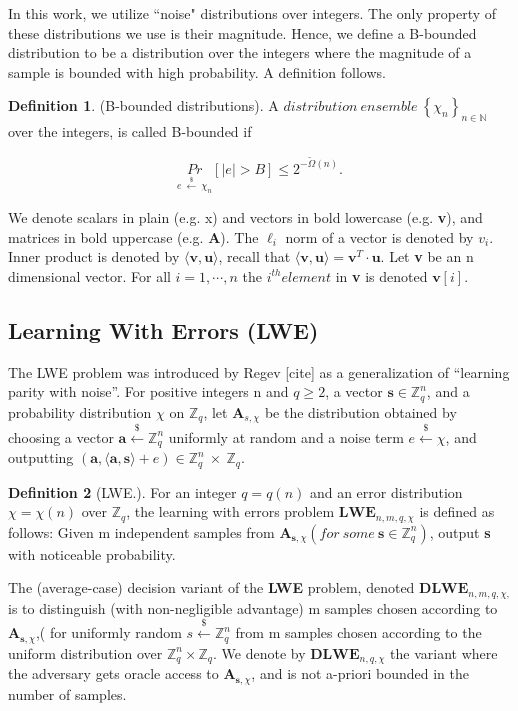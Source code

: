 \documentclass[10pt,journal,compsoc]{IEEEtran}
\theoremstyle{definition}
\newtheorem{definition}{Definition}[section]
\begin{document}
In this work, we utilize ``noise" distributions over integers. The only property of these distributions
we use is their magnitude. Hence, we define a B-bounded distribution to be a distribution
over the integers where the magnitude of a sample is bounded with high probability. A definition
follows.


\begin{definition}

(B-bounded distributions). A $distribution\ ensemble \ \left\{ \chi_n \right\}_{n \in \mathbb{N}}$ over the integers, is called B-bounded if 

$$\underset{e \ \xleftarrow{\$} \ \chi_n}{Pr} \left[ \left| e\right|> B\right] \leq 2^{-\widetilde{\Omega}\left(n\right)}.$$

We denote scalars in plain (e.g. x) and vectors in bold lowercase (e.g. \textbf{v}), and matrices in bold uppercase (e.g. \textbf{A}).  The $\ell_i$ norm of a vector is denoted by $v_i$. Inner product is denoted by $\langle \textbf{v},\textbf{u} \rangle$, recall that $\langle \textbf{v},\textbf{u} \rangle = \textbf{v}^T \cdot \textbf{u}$. Let \textbf{v} be an n dimensional vector. For all $i = 1,\cdots,n$ the $i^{th} element$ in \textbf{v} is denoted $\textbf{v}[i]$.

\end{definition}

\subsection{Learning With Errors (LWE)}

The LWE problem was introduced by Regev [cite] as a generalization of “learning parity with
noise”. For positive integers n and $q \geq 2$, a vector $\textbf{s}\in \mathbb{Z}^n_q$, and a probability distribution $\chi$ on $\mathbb{Z}_q$, let $\textbf{A}_{s,\chi}$ be the distribution  obtained by choosing a vector $\textbf{a} \xleftarrow{\$} \mathbb{Z}_q^n$ uniformly at random  and a noise term $e \xleftarrow{\$}\chi$, and outputting $\left(\textbf{a},\langle\textbf{a},\textbf{s}\rangle + e\right) \in \mathbb{Z}_q^n \ \times \ \mathbb{Z}_q$.

\begin{definition}[LWE.]
 For an integer $q = q(n)$ and an error distribution $\chi = \chi(n)$ over $\mathbb{Z}_q$, the
learning with errors problem $\textbf{LWE}_{n,m,q,\chi}$ is defined as follows: Given m independent samples from $\textbf{A}_{\textbf{s},\chi} \left(for\ some \ \textbf{s} \in \mathbb{Z}_q^n\right)$, output \textbf{s} with noticeable probability. 

	
The (average-case) decision variant of the \textbf{LWE} problem, denoted $\textbf{DLWE}_{n,m,q,\chi,}$  is to distinguish (with non-negligible advantage) m samples chosen according to $\textbf{A}_{\textbf{s},\chi}$,( for uniformly random $s\xleftarrow{\$} \mathbb{Z}_q^n$ 
from m samples chosen according to the uniform distribution over $\mathbb{Z}_q^n \times \mathbb{Z}_q$.  We denote by $\textbf{DLWE}_{n,q,\chi}$ the variant where the adversary gets oracle access to $\textbf{A}_{\textbf{s},\chi}$, and is not a-priori bounded in the number of samples.


\end{definition}
\end{document}
